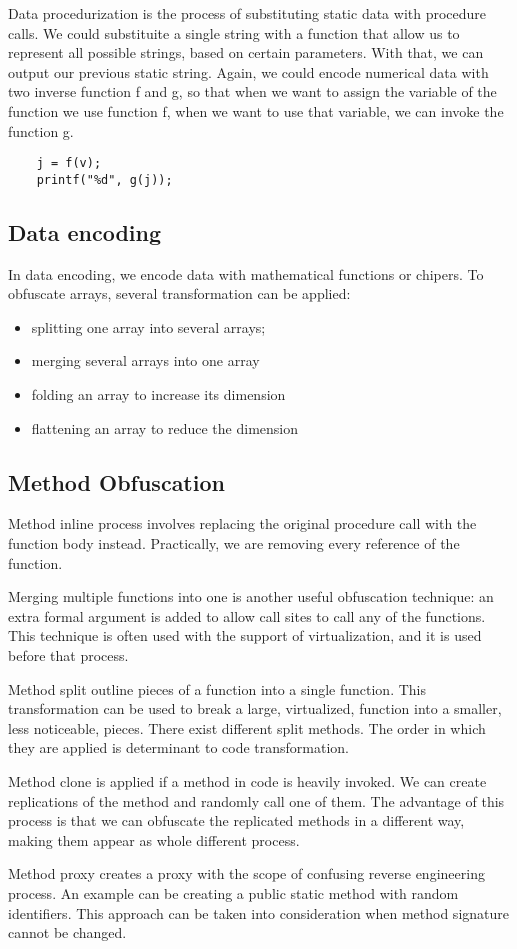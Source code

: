 Data procedurization is the process of substituting static data with procedure calls. We could substituite a single string with a function that allow us to represent all possible strings, based on certain parameters. With that, we can output our previous static string. 
Again, we could encode numerical data with two inverse function f and g, so that when we want to assign the variable of the function we use function f, when we want to use that variable, we can invoke the function g.

\begin{lstlisting}
    j = f(v);
    printf("%d", g(j));
\end{lstlisting}

\subsection{Data encoding}

In data encoding, we encode data with mathematical functions or chipers. 
To obfuscate arrays, several transformation can be applied: 
\begin{itemize}
    \item splitting one array into several arrays; 
    \item merging several arrays into one array
    \item folding an array to increase its dimension
    \item flattening an array to reduce the dimension
\end{itemize}

\subsection{Method Obfuscation}

Method inline process involves replacing the original procedure call with the function body instead. Practically, we are removing every reference of the function. 
\par
Merging multiple functions into one is another useful obfuscation technique: an extra formal argument is added to allow call sites to call any of the functions. This technique is often used with the support of virtualization, and it is used before that process. 
\par 
Method split outline pieces of a function into a single function. This transformation can be used to break a large, virtualized, function into a smaller, less noticeable, pieces. 
There exist different split methods. The order in which they are applied is determinant to code transformation. 
\par 
Method clone is applied if a method in code is heavily invoked. We can create replications of the method and randomly call one of them. The advantage of this process is that we can obfuscate the replicated methods in a different way, making them appear as whole different process. 
\par
Method proxy creates a proxy with the scope of confusing reverse engineering process. 
An example can be creating a public static method with random identifiers. 
This approach can be taken into consideration when method signature cannot be changed. 


